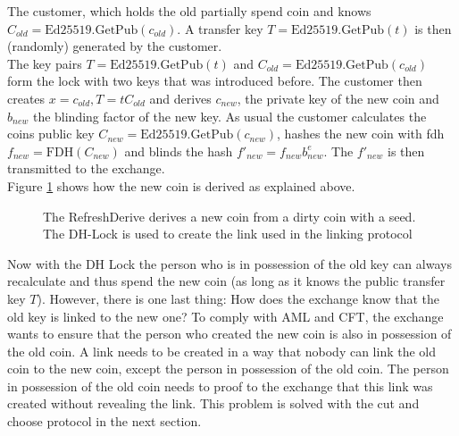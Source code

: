 The customer, which holds the old partially spend coin and knows \\$C_{old} = \text{Ed25519.GetPub}(c_{old})$.
    A transfer key $T = \text{Ed25519.GetPub}(t)$ is then (randomly) generated by the customer.
    \\The key pairs $T = \text{Ed25519.GetPub}(t)$ and $C_{old} = \text{Ed25519.GetPub}(c_{old})$ form the lock with two keys that was introduced before.
    The customer then creates $x = c_{old}, T = tC_{old}$ and derives $c_{new}$, the private key of the new coin and $b_{new}$ the blinding factor of the new key.
    As usual the customer calculates the coins public key $C_{new} = \text{Ed25519.GetPub}(c_{new})$, hashes the new coin with \gls{fdh} $f_{new} = \text{FDH}(C_{new})$ and blinds the hash $f'_{new} = f_{new}b_{new}^e$.
    The $f'_{new}$ is then transmitted to the exchange.
    \\Figure \ref{fig:refresh-derive} shows how the new coin is derived as explained above.

    \begin{figure}[htp]
        \centering
        \caption[RefreshDerive algorithm]{The RefreshDerive derives a new coin from a dirty coin with a seed. The DH-Lock is used to create the link used in the linking protocol}
        \label{fig:refresh-derive}
    \end{figure}

    Now with the DH Lock the person who is in possession of the old key can always recalculate and thus spend the new coin (as long as it knows the public transfer key $T$).
    However, there is one last thing: How does the exchange know that the old key is linked to the new one?
    To comply with \ac{AML} and \ac{CFT}, the exchange wants to ensure that the person who created the new coin is also in possession of the old coin.
    A link needs to be created in a way that nobody can link the old coin to the new coin, except the person in possession of the old coin.
    The person in possession of the old coin needs to proof to the exchange that this link was created without revealing the link.
    This problem is solved with the cut and choose protocol in the next section.

